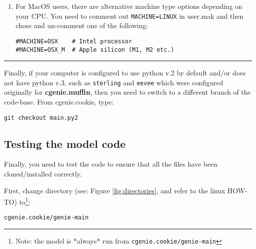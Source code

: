 \begin{itemize}
\begin{enumerate}[noitemsep]
\vspace{2mm}
\item For MacOS users, there are alternative machine type options depending on your CPU. You need to comment out \texttt{MACHINE=LINUX} in  \textsf{\footnotesize user.mak} and then chose and un-comment one of the following:
\small\begin{verbatim}
#MACHINE=OSX	# Intel processor
#MACHINE=OSX_M	# Apple silicon (M1, M2 etc.)
\end{verbatim}\normalsize

\end{enumerate}

\end{itemize}

\vspace{1mm}\noindent\rule{4cm}{0.5pt}\vspace{2mm}

\noindent Finally, if your computer is configured to use python v.2 by default and/or does not have python v.3, such as \texttt{sterling} and \texttt{eevee} which were configured originally for \textbf{cgenie.muffin}, then you need to switch to a different branch of the code-base. From \textsf{\footnotesize cgenie.cookie}, type:

\vspace{-2mm}
\small\begin{verbatim}
git checkout main.py2
\end{verbatim}\normalsize

\newpage

\subsection{Testing the model code}

\noindent Finally, you need to test the code to ensure that all the files have been cloned/installed correctly.

\vspace{1mm} 
\noindent First, change directory (see: Figure \ref{fig:directories}, and refer to the linux HOW-TO) to\footnote{Note: the model is *always* run from \texttt{cgenie.cookie/genie-main}}:
\vspace{-2mm}
\small\begin{verbatim}
cgenie.cookie/genie-main
\end{verbatim}\normalsize
\vspace{-2mm}

